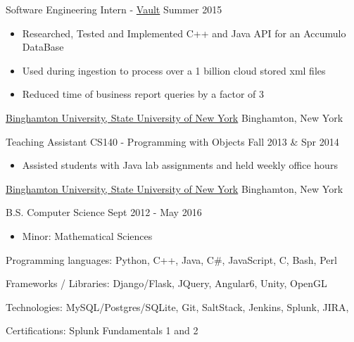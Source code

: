 \documentclass[11pt]{article}
\begin{document}
{{    }
    \headedsubsection
    {Software Engineering Intern - \href{https://www.bloomberg.com/professional/product/vault/}{Vault}}
    {Summer 2015}
    {
        \begin{itemize}
            \item Researched, Tested and Implemented C++ and Java API for an Accumulo DataBase
            \item Used during ingestion to process over a 1 billion cloud stored xml files
            \item Reduced time of business report queries by a factor of 3
        \end{itemize}
    }
}

\headedsection  %
{\href{http://www.binghamton.edu/index.php}{Binghamton University, State University of New York}}
{Binghamton, New York}
{
    \headedsubsection
    {Teaching Assistant CS140 - Programming with Objects}
    {Fall 2013 \& Spr 2014}
    {
        \begin{itemize}
            \item Assisted students with Java lab assignments and held weekly office hours
        \end{itemize}
    }
}

\spacedhrule{0.5em}{0.5em}  %

\headedsection
{\href{http://www.binghamton.edu/index.php}{Binghamton University, State University of New York}}
{Binghamton, New York} {
    \headedsubsection
    {B.S. Computer Science}
    {Sept 2012 - May 2016}
    {
        \begin{itemize} \item Minor: Mathematical Sciences \end{itemize}
    }
}
\spacedhrule{0.1em}{0.3em}  %

\inlineskillsection  %
{Programming languages:}
{ Python, C++, Java, C\#, JavaScript, C, Bash, Perl }

\inlineskillsection  
{Frameworks / Libraries:}
{ Django/Flask, JQuery, Angular6, Unity, OpenGL}

\inlineskillsection
{Technologies:}
{ MySQL/Postgres/SQLite, Git, SaltStack, Jenkins, Splunk, JIRA, \latex }

\inlineskillsection
{Certifications:}
{Splunk Fundamentals 1 and 2}
\end{document}
